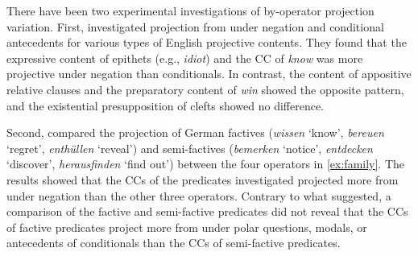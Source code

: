 \documentclass[a4paper,12pt,twoside]{article}
\newcommand{\poscite}[1]{\citeauthor{#1}'s \citeyear{#1}}
\begin{document}
    There have been two experimental investigations of by-operator projection variation. First, \citet{smith_relationship_2014} investigated projection from under negation and conditional antecedents for various types of English projective contents. They found that the expressive content of epithets (e.g., \textit{idiot}) and the CC of \textit{know} was more projective under negation than conditionals. In contrast, the content of appositive relative clauses and the preparatory content of \textit{win} showed the opposite pattern, and the existential presupposition of clefts showed no difference. %
    
    Second, \citet{sieker_projective_2022}  compared the projection of German factives (\textit{wissen} `know', \textit{bereuen} `regret', \textit{ent\-hüllen} `reveal') and semi-factives (\textit{bemerken} `notice', \textit{entdecken} `discover', \textit{herausfinden} `find out') between the four operators in \ref{ex:family}. The results showed that the CCs of the predicates investigated projected more from under negation than the other three operators. Contrary to what \citet{karttunen_observations_1971} suggested, a comparison of the factive and
    semi-factive predicates did not reveal that the CCs of factive predicates project more from under polar questions, modals, or antecedents of conditionals than the CCs of semi-factive predicates.

\end{document}
